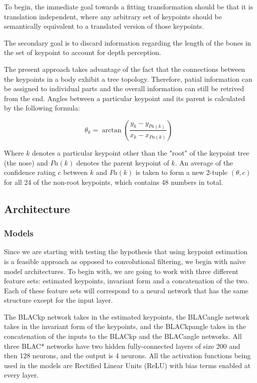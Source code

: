 \documentclass{article}
\begin{document}
To begin, the immediate goal towards a fitting transformation should be that it is translation independent, where any arbitrary set of keypoints should be semantically equivalent to a translated version of those keypoints. 

The secondary goal is to discard information regarding the length of the bones in the set of keypoint to account for depth perception.

The present approach takes advantage of the fact that the connections between the keypoints in a body exhibit a tree topology. Therefore, patial information can be assigned to individual parts and the overall information can still be retrived from the end. Angles between a particular keypoint and its parent is calculated by the following formula:

$$
\theta_k = \arctan \left(\frac{y_k -y_{Pa(k)}}{x_k -x_{Pa(k)}} \right)
$$

Where $k$ denotes a particular keypoint other than the "root" of the keypoint tree (the nose) and $Pa(k)$ denotes the parent keypoint of $k$. An average of the confidence rating $c$ between $k$ and $Pa(k)$ is taken to form a new 2-tuple $(\theta, c)$ for all 24 of the non-root keypoints, which contains 48 numbers in total.

\subsection{Architecture}

\subsubsection{Models}

Since we are starting with testing the hypothesis that using keypoint estimation is a feasible approach as opposed to convolutional filtering, we begin with na\"ive model architectures. To begin with, we are going to work with three different feature sets: estimated keypoints, invariant form and a concatenation of the two. Each of these feature sets will correspond to a neural network that has the same structure except for the input layer. 

The BLACkp network takes in the estimated keypoints, the BLACangle network takes in the invariant form of the keypoints, and the BLACkpangle takes in the concatenation of the inputs to the BLACkp and the BLACangle networks. All three BLAC* networks have two hidden fully-connected layers of size 200 and then 128 neurons, and the output is 4 neurons. All the activation functions being used in the models are Rectified Linear Units (ReLU) with bias terms enabled at every layer.
\end{document}
